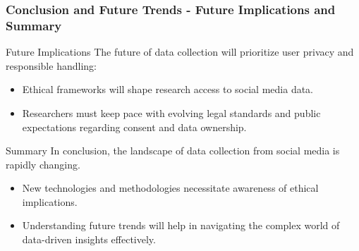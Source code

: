 \documentclass{beamer}
\begin{document}
\begin{frame}[fragile]
    \frametitle{Conclusion and Future Trends - Future Implications and Summary}
    \begin{block}{Future Implications}
        The future of data collection will prioritize user privacy and responsible handling:
        \begin{itemize}
            \item Ethical frameworks will shape research access to social media data.
            \item Researchers must keep pace with evolving legal standards and public expectations regarding consent and data ownership.
        \end{itemize}
    \end{block}
    
    \begin{block}{Summary}
        In conclusion, the landscape of data collection from social media is rapidly changing. 
        \begin{itemize}
            \item New technologies and methodologies necessitate awareness of ethical implications.
            \item Understanding future trends will help in navigating the complex world of data-driven insights effectively.
        \end{itemize}
    \end{block}
\end{frame}
\end{document}
